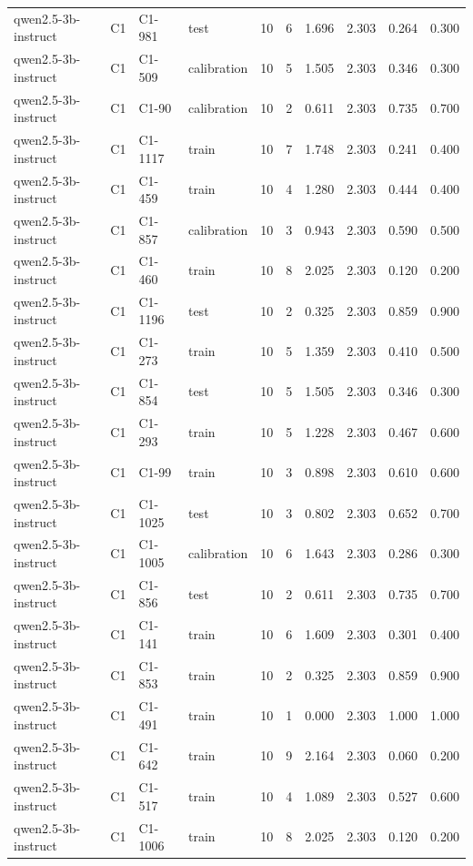 \begin{table}
\begin{tabular}{llllrrrrrr}
qwen2.5-3b-instruct & C1 & C1-981 & test & 10 & 6 & 1.696 & 2.303 & 0.264 & 0.300 \\
qwen2.5-3b-instruct & C1 & C1-509 & calibration & 10 & 5 & 1.505 & 2.303 & 0.346 & 0.300 \\
qwen2.5-3b-instruct & C1 & C1-90 & calibration & 10 & 2 & 0.611 & 2.303 & 0.735 & 0.700 \\
qwen2.5-3b-instruct & C1 & C1-1117 & train & 10 & 7 & 1.748 & 2.303 & 0.241 & 0.400 \\
qwen2.5-3b-instruct & C1 & C1-459 & train & 10 & 4 & 1.280 & 2.303 & 0.444 & 0.400 \\
qwen2.5-3b-instruct & C1 & C1-857 & calibration & 10 & 3 & 0.943 & 2.303 & 0.590 & 0.500 \\
qwen2.5-3b-instruct & C1 & C1-460 & train & 10 & 8 & 2.025 & 2.303 & 0.120 & 0.200 \\
qwen2.5-3b-instruct & C1 & C1-1196 & test & 10 & 2 & 0.325 & 2.303 & 0.859 & 0.900 \\
qwen2.5-3b-instruct & C1 & C1-273 & train & 10 & 5 & 1.359 & 2.303 & 0.410 & 0.500 \\
qwen2.5-3b-instruct & C1 & C1-854 & test & 10 & 5 & 1.505 & 2.303 & 0.346 & 0.300 \\
qwen2.5-3b-instruct & C1 & C1-293 & train & 10 & 5 & 1.228 & 2.303 & 0.467 & 0.600 \\
qwen2.5-3b-instruct & C1 & C1-99 & train & 10 & 3 & 0.898 & 2.303 & 0.610 & 0.600 \\
qwen2.5-3b-instruct & C1 & C1-1025 & test & 10 & 3 & 0.802 & 2.303 & 0.652 & 0.700 \\
qwen2.5-3b-instruct & C1 & C1-1005 & calibration & 10 & 6 & 1.643 & 2.303 & 0.286 & 0.300 \\
qwen2.5-3b-instruct & C1 & C1-856 & test & 10 & 2 & 0.611 & 2.303 & 0.735 & 0.700 \\
qwen2.5-3b-instruct & C1 & C1-141 & train & 10 & 6 & 1.609 & 2.303 & 0.301 & 0.400 \\
qwen2.5-3b-instruct & C1 & C1-853 & train & 10 & 2 & 0.325 & 2.303 & 0.859 & 0.900 \\
qwen2.5-3b-instruct & C1 & C1-491 & train & 10 & 1 & 0.000 & 2.303 & 1.000 & 1.000 \\
qwen2.5-3b-instruct & C1 & C1-642 & train & 10 & 9 & 2.164 & 2.303 & 0.060 & 0.200 \\
qwen2.5-3b-instruct & C1 & C1-517 & train & 10 & 4 & 1.089 & 2.303 & 0.527 & 0.600 \\
qwen2.5-3b-instruct & C1 & C1-1006 & train & 10 & 8 & 2.025 & 2.303 & 0.120 & 0.200 \\

\end{tabular}
\end{table}
